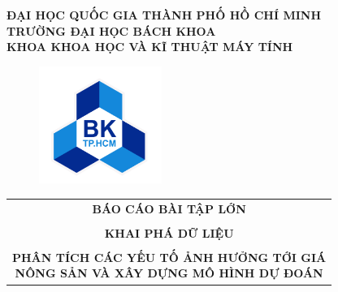 \documentclass[a4paper]{article}
\theoremstyle{definition}
\begin{document}
\begin{titlepage}

\begin{center}
\LARGE \textbf{ĐẠI HỌC QUỐC GIA THÀNH PHỐ HỒ CHÍ MINH} \\
\vspace{0.2cm}
\LARGE \textbf{TRƯỜNG ĐẠI HỌC BÁCH KHOA} \\
\vspace{0.2cm}
\LARGE \textbf{KHOA KHOA HỌC VÀ KĨ THUẬT MÁY TÍNH}
\end{center}

\vspace{0.3cm}

\begin{figure}[h!]
\begin{center}
\includegraphics[width=4cm]{Images/hcmut.png}
\end{center}
\end{figure}

\begin{center}
\begin{tabular}{c}
\textbf{{\LARGE BÁO CÁO BÀI TẬP LỚN}} \\
\\
\textbf{{\LARGE KHAI PHÁ DỮ LIỆU}} \\[15pt]
\\
\parbox{0.9\textwidth}{%
    \centering
    \textbf{\LARGE PHÂN TÍCH CÁC YẾU TỐ ẢNH HƯỞNG TỚI GIÁ \\[6pt] NÔNG SẢN VÀ XÂY DỰNG MÔ HÌNH DỰ ĐOÁN}
}
\end{tabular}
\end{center}


\end{titlepage}
\end{document}
